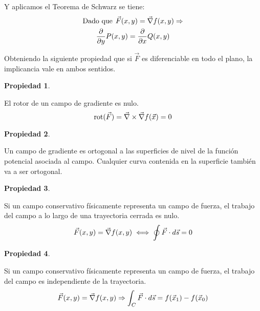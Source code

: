 \documentclass[a5paper,12pt,twoside]{book}
\newtheorem{prop}{{Propiedad}}[chapter]
\begin{document}
Y aplicamos el Teorema de Schwarz se tiene:
\begin{gather*}
    \textrm{Dado que} \hspace{1ex} \Vec{F}(x,y) = \Vec{\nabla} f(x,y) \Rightarrow
    \\
    \dfrac{\partial}{\partial y} P(x,y) = \dfrac{\partial}{\partial x} Q(x,y)
\end{gather*}
    
Obteniendo la siguiente propiedad que si $\Vec{F}$ es diferenciable en todo el plano, la implicancia vale en ambos sentidos.

\begin{mdframed}[style=PropertyFrame]
    \begin{prop}
    \end{prop}
    El rotor de un campo de gradiente es nulo.
    \begin{equation*}
        \operatorname{rot}(\Vec{F})= \Vec{\nabla} \times \Vec{\nabla} f(\Vec{x}) = 0
    \end{equation*}
\end{mdframed}

\begin{mdframed}[style=PropertyFrame]
    \begin{prop}
    \end{prop}
    Un campo de gradiente es ortogonal a las superficies de nivel de la función potencial asociada al campo.
    Cualquier curva contenida en la superficie también va a ser ortogonal.
\end{mdframed}

\begin{mdframed}[style=PropertyFrame]
    \begin{prop}
    \end{prop}
    Si un campo conservativo físicamente representa un campo de fuerza, el trabajo del campo a lo largo de una trayectoria cerrada es nulo.
    \begin{equation*}
        \Vec{F}(x,y) = \Vec{\nabla} f(x,y) \iff \oint \Vec{F} \cdot d \Vec{s} = 0
    \end{equation*}
\end{mdframed}

\begin{mdframed}[style=PropertyFrame]
    \begin{prop}
    \end{prop}
    Si un campo conservativo físicamente representa un campo de fuerza, el trabajo del campo es independiente de la trayectoria.
    \begin{equation*}
        \Vec{F}(x,y) = \Vec{\nabla} f(x,y) \Rightarrow \int_C \Vec{F} \cdot d \Vec{s} = f(\Vec{x}_1)-f(\Vec{x}_0)
    \end{equation*}
\end{mdframed}
\end{document}
